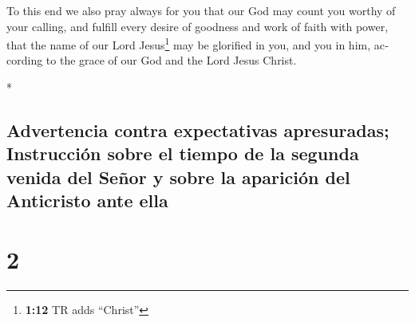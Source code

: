 \begin{paracol}{2}
\begin{otherlanguage}{english}
 To this end we also pray always for you that our God may
count you worthy of your calling, and fulfill every desire of goodness
and work of faith with power,  that the name of our Lord
Jesus\footnote{\textbf{1:12} TR adds ``Christ''} may be glorified in
you, and you in him, according to the grace of our God and the Lord
Jesus Christ.

\end{otherlanguage}

\switchcolumn[0]*

\hypertarget{advertencia-contra-expectativas-apresuradas-instrucciuxf3n-sobre-el-tiempo-de-la-segunda-venida-del-seuxf1or-y-sobre-la-apariciuxf3n-del-anticristo-ante-ella}{%
\subsection{Advertencia contra expectativas apresuradas; Instrucción
sobre el tiempo de la segunda venida del Señor y sobre la aparición del
Anticristo ante
ella}\label{advertencia-contra-expectativas-apresuradas-instrucciuxf3n-sobre-el-tiempo-de-la-segunda-venida-del-seuxf1or-y-sobre-la-apariciuxf3n-del-anticristo-ante-ella}}

\hypertarget{section-2}{%
\section{2}\label{section-2}}


\end{paracol}
